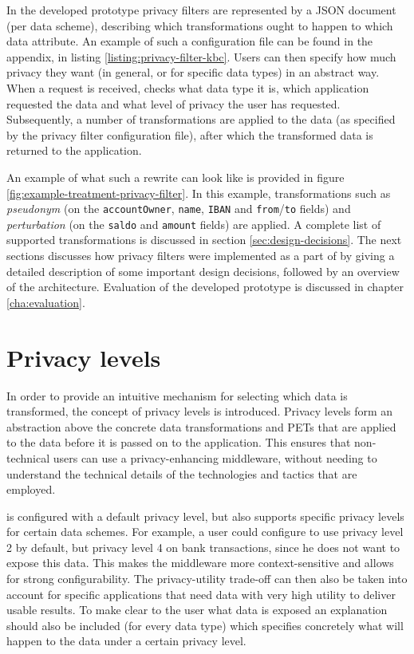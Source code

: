 

\noindent In the developed prototype privacy filters are represented by a JSON document (per data scheme), describing which transformations ought to happen to which data attribute. An example of such a configuration file can be found in the appendix, in listing \ref{listing:privacy-filter-kbc}. Users can then specify how much privacy they want (in general, or for specific data types) in an abstract way. 
When a request is received, \middleware{} checks what data type it is, which application requested the data and what level of privacy the user has requested. Subsequently, a number of transformations are applied to the data (as specified by the privacy filter configuration file), after which the transformed data is returned to the application. 

An example of what such a rewrite can look like is provided in figure \ref{fig:example-treatment-privacy-filter}. In this example, transformations such as \textit{pseudonym} (on the \texttt{accountOwner}, \texttt{name}, \texttt{IBAN} and \texttt{from}/\texttt{to} fields) and \textit{perturbation} (on the \texttt{saldo} and \texttt{amount} fields) are applied. A complete list of supported transformations is discussed in section \ref{sec:design-decisions}. The next sections discusses how privacy filters were implemented as a part of \middleware{} by giving a detailed description of some important design decisions, followed by an overview of the architecture. Evaluation of the developed prototype is discussed in chapter \ref{cha:evaluation}.



\section{Privacy levels}
\label{sec:privacylevels}
\noindent In order to provide an intuitive mechanism for selecting which data is transformed, the concept of privacy levels is introduced. Privacy levels form an abstraction above the concrete data transformations and \gls{PETs} that are applied to the data before it is passed on to the application. This ensures that non-technical users can use a privacy-enhancing middleware, without needing to understand the technical details of the technologies and tactics that are employed. 

\middleware{} is configured with a default privacy level, but also supports specific privacy levels for certain data schemes. For example, a user could configure \middleware{} to use privacy level 2 by default, but privacy level 4 on bank transactions, since he does not want to expose this data. This makes the middleware more context-sensitive and allows for strong configurability. The privacy-utility trade-off can then also be taken into account for specific applications that need data with very high utility to deliver usable results. To make clear to the user what data is exposed an explanation should also be included (for every data type) which specifies concretely what will happen to the data under a certain privacy level.

